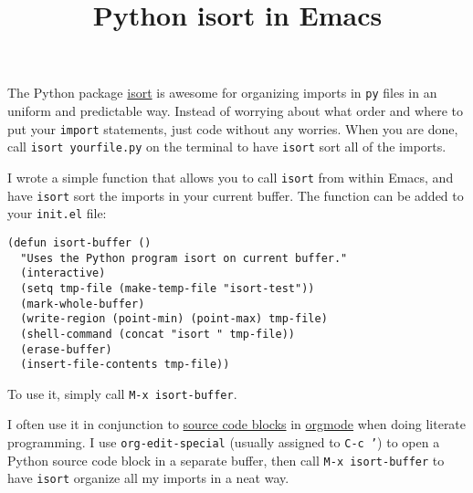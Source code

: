 \documentclass[12pt, a4paper]{article}
\date{}
\title{Python isort in Emacs}
\begin{document}
\maketitle
The Python package \href{https://github.com/timothycrosley/isort}{isort} is awesome for organizing imports in \texttt{py} files in an uniform and predictable way.
Instead of worrying about what order and where to put your \texttt{import} statements, just code without any worries. When you are done, call \texttt{isort yourfile.py} on the terminal to have \texttt{isort} sort all of the imports.

I wrote a simple function that allows you to call \texttt{isort} from within Emacs, and have \texttt{isort} sort the imports in your current buffer.
The function can be added to your \texttt{init.el} file:
\lstset{language=elisp,label= ,caption= ,captionpos=b,numbers=none}
\begin{lstlisting}
(defun isort-buffer ()
  "Uses the Python program isort on current buffer."
  (interactive)
  (setq tmp-file (make-temp-file "isort-test"))
  (mark-whole-buffer)
  (write-region (point-min) (point-max) tmp-file)
  (shell-command (concat "isort " tmp-file))
  (erase-buffer)
  (insert-file-contents tmp-file))
\end{lstlisting}
To use it, simply call \texttt{M-x isort-buffer}.

I often use it in conjunction to \href{https://orgmode.org/manual/Working-with-source-code.html}{source code blocks} in \href{https://orgmode.org}{orgmode} when doing literate programming.
I use \texttt{org-edit-special} (usually assigned to \texttt{C-c '}) to open a Python source code block in a separate buffer, then call \texttt{M-x isort-buffer} to have \texttt{isort} organize all my imports in a neat way.
\end{document}
